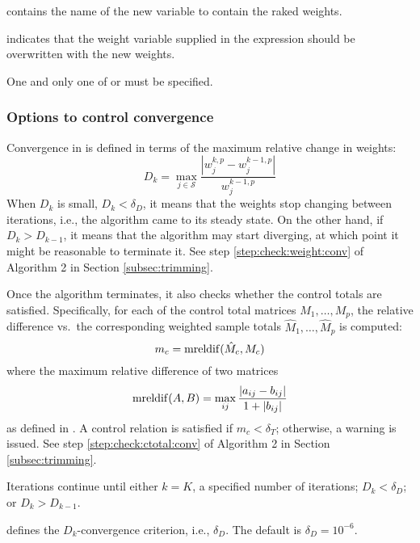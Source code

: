 \hangpara
{}
contains the name of the new variable to contain the raked weights.

\hangpara
{} indicates that the weight variable supplied in the
\stcmd{[pw=\varname]} expression should be overwritten with the new weights.

One and only one of  or  must be specified.

\subsubsection{Options to control convergence}

\begin{sttech}
Convergence in  is defined in terms of the maximum relative
change in weights:
\begin{equation}
    D_k = \max_{j \in \mathcal{S}} \frac{|w_j^{k,p}-w_j^{k-1,p}|}{w_j^{k-1,p}}
    \label{eq:conv:ratio:weights}
\end{equation}
When $D_k$ is small, $D_k < \delta_D$, it means that the weights stop
changing between iterations, i.e., the algorithm came to its steady state.
On the other hand, if $D_k > D_{k-1}$, it means that the algorithm
may start diverging, at which point it might be reasonable to terminate it.
See step \ref{step:check:weight:conv} of Algorithm 2 in Section \ref{subsec:trimming}.

Once the algorithm terminates, it also checks whether the control totals
are satisfied. Specifically, for each of the control total matrices
$M_1, \ldots, M_p$, the relative difference vs.\ the corresponding weighted
sample totals $\hat M_1, \ldots, \hat M_p$ is computed:
\begin{equation}
    m_c = {\rm mreldif}( \hat M_c, M_c )
    \label{eq:conv:mreldif}
\end{equation}
where the maximum relative difference of two matrices
$$
{\rm mreldif}(A,B) = \max_{ij} \frac{|a_{ij}-b_{ij}|}{1+|b_{ij}|}
$$
as defined in . A control relation is satisfied
if $m_c < \delta_T$; otherwise, a warning is issued.
See step \ref{step:check:ctotal:conv} of Algorithm 2 in Section \ref{subsec:trimming}.

Iterations continue until either $k = K$, a specified number of iterations; 
$D_k < \delta_D$; or $D_k > D_{k-1}$.
\end{sttech}

\hangpara
{} defines the $D_k$-convergence
criterion, i.e., $\delta_D$. The default is $\delta_D = 10^{-6}$.

